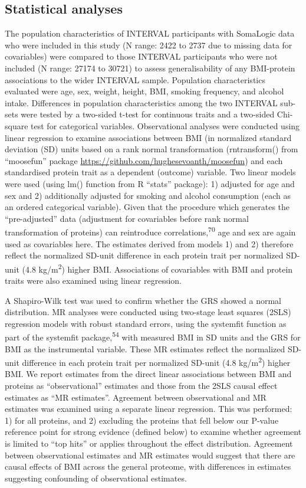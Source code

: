 \documentclass[11pt,twoside]{bristolthesis}
\begin{document}
\hypertarget{statistical-analyses}{%
\subsection{Statistical analyses}\label{statistical-analyses}}

The population characteristics of INTERVAL participants with SomaLogic data who were included in this study (N range: 2422 to 2737 due to missing data for covariables) were compared to those INTERVAL participants who were not included (N range: 27174 to 30721) to assess generalisability of any BMI-protein associations to the wider INTERVAL sample. Population characteristics evaluated were age, sex, weight, height, BMI, smoking frequency, and alcohol intake. Differences in population characteristics among the two INTERVAL sub-sets were tested by a two-sided t-test for continuous traits and a two-sided Chi-square test for categorical variables. Observational analyses were conducted using linear regression to examine associations between BMI (in normalized standard deviation (SD) units based on a rank normal transformation (rntransform() from ``moosefun'' package \url{https://github.com/hughesevoanth/moosefun}) and each standardised protein trait as a dependent (outcome) variable. Two linear models were used (using lm() function from R ``stats'' package): 1) adjusted for age and sex and 2) additionally adjusted for smoking and alcohol consumption (each as an ordered categorical variable). Given that the procedure which generates the ``pre-adjusted'' data (adjustment for covariables before rank normal transformation of proteins) can reintroduce correlations,\textsuperscript{70} age and sex are again used as covariables here. The estimates derived from models 1) and 2) therefore reflect the normalized SD-unit difference in each protein trait per normalized SD-unit (4.8 kg/m\textsuperscript{2}) higher BMI. Associations of covariables with BMI and protein traits were also examined using linear regression.

A Shapiro-Wilk test was used to confirm whether the GRS showed a normal distribution. MR analyses were conducted using two-stage least squares (2SLS) regression models with robust standard errors, using the systemfit function as part of the systemfit package,\textsuperscript{54} with measured BMI in SD units and the GRS for BMI as the instrumental variable. These MR estimates reflect the normalized SD-unit difference in each protein trait per normalized SD-unit (4.8 kg/m\textsuperscript{2}) higher BMI. We report estimates from the direct linear associations between BMI and proteins as ``observational'' estimates and those from the 2SLS causal effect estimates as ``MR estimates''. Agreement between observational and MR estimates was examined using a separate linear regression. This was performed: 1) for all proteins, and 2) excluding the proteins that fell below our P-value reference point for strong evidence (defined below) to examine whether agreement is limited to ``top hits'' or applies throughout the effect distribution. Agreement between observational estimates and MR estimates would suggest that there are causal effects of BMI across the general proteome, with differences in estimates suggesting confounding of observational estimates.
\end{document}
